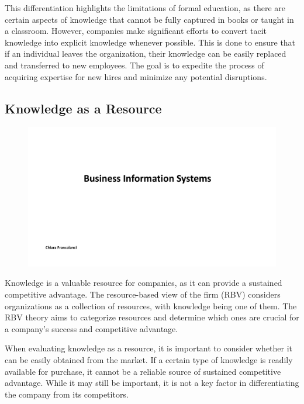 This differentiation highlights the limitations of formal education, as
there are certain aspects of knowledge that cannot be fully captured in
books or taught in a classroom. However, companies make significant
efforts to convert tacit knowledge into explicit knowledge whenever
possible. This is done to ensure that if an individual leaves the
organization, their knowledge can be easily replaced and transferred to
new employees. The goal is to expedite the process of acquiring
expertise for new hires and minimize any potential disruptions.

\subsection{Knowledge as a Resource}\label{knowledge-as-a-resource}

\begin{figure}[!h]
  \centering
  \includegraphics[page=6, trim = 1.5cm 2.8cm 1.5cm 4cm, clip, width=\imagewidth]{images/05 - KM.pdf}
\end{figure}

Knowledge is a valuable resource for companies, as it can provide a
sustained competitive advantage. The resource-based view of the firm
(RBV) considers organizations as a collection of resources, with
knowledge being one of them. The RBV theory aims to categorize resources
and determine which ones are crucial for a company's success and
competitive advantage.

When evaluating knowledge as a resource, it is important to consider
whether it can be easily obtained from the market. If a certain type of
knowledge is readily available for purchase, it cannot be a reliable
source of sustained competitive advantage. While it may still be
important, it is not a key factor in differentiating the company from
its competitors.

